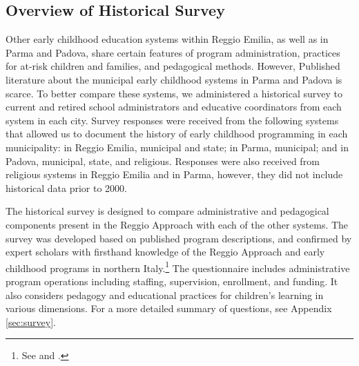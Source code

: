 
\subsection{Overview of Historical Survey} \label{sec:survey-overview}

Other early childhood education systems within Reggio Emilia, as well as in Parma and Padova, share certain features of program administration, practices for at-risk children and families, and pedagogical methods. However, Published literature about the municipal early childhood systems in Parma and Padova is scarce. To better compare these systems, we administered a historical survey to current and retired school administrators and educative coordinators from each system in each city. Survey responses were received from the following systems that allowed us to document the history of early childhood programming in each municipality: in Reggio Emilia, municipal and state; in Parma, municipal; and in Padova, municipal, state, and religious. Responses were also received from religious systems in Reggio Emilia and in Parma, however, they did not include historical data prior to 2000. 

The historical survey is designed to compare administrative and pedagogical components present in the Reggio Approach with each of the other systems. The survey was developed based on published program descriptions, and confirmed by expert scholars with firsthand knowledge of the Reggio Approach and early childhood programs in northern Italy.\footnote{See \citet{Edwards-etal-eds_1998_Hundred-Languages} and \citet{Corsaro_2008_Policy-Practice}.} The questionnaire includes administrative program operations including staffing, supervision, enrollment, and funding. It also considers pedagogy and educational practices for children's learning in various dimensions. For a more detailed summary of questions, see Appendix \ref{sec:survey}.


